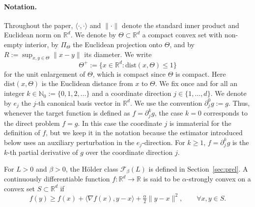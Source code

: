 \documentclass{article}
\renewcommand{\leq}{\leqslant}
\renewcommand{\geq}{\geqslant}
\renewcommand{\ge}{\geqslant}
\theoremstyle{definition}
\begin{document}

\paragraph{Notation.}
Throughout the paper, $\langle\cdot,\cdot\rangle$ and
$\|\cdot\|$ denote the standard inner product and Euclidean norm
on $\mathbb{R}^d$. We denote by $\Theta\subset\mathbb{R}^d$ a
compact convex set with non-empty interior, by $\Pi_\Theta$ the
Euclidean projection onto $\Theta$, and by
$R:=\sup_{x,y\in\Theta}\|x-y\|$ its diameter. We write
\[
\Theta^+:=\{x\in\mathbb{R}^d:\mathrm{dist}(x,\Theta)\leq 1\}
\]
for the unit enlargement of $\Theta$, which is compact since $\Theta$
is compact. Here $\mathrm{dist}(x,\Theta)$ is the Euclidean distance from $x$ to $\Theta$. We fix once and for all an integer
\(k\in\mathbb N_0:=\{0,1,2,\ldots\}\) and a coordinate direction
\(j\in\{1,\ldots,d\}\). We denote by $e_j$ the $j$-th canonical basis vector in $\mathbb{R}^d$. We use the convention
\(
\partial_j^0 g := g .
\)
Thus, whenever the target function is defined as \(f=\partial_j^k g\),
the case \(k=0\) corresponds to the direct problem \(f=g\). In this
case the coordinate \(j\) is immaterial for the definition of \(f\),
but we keep it in the notation because the estimator introduced below
uses an auxiliary perturbation in the \(e_j\)-direction. For \(k\ge1\),
\(f=\partial_j^k g\) is the \(k\)-th  partial derivative
of \(g\) over the coordinate direction $j$.

For $L>0$ and $\beta>0$, the H\"older class
$\mathcal{F}_\beta(L)$ is defined in Section~\ref{sec:prel}. A
continuously differentiable function $f:\mathbb{R}^d\to\mathbb{R}$ is said to be
$\alpha$-strongly convex on a convex set $S\subset\mathbb{R}^d$
if
\[
f(y)\geq f(x)+\langle\nabla f(x),y-x\rangle
+\tfrac{\alpha}{2}\|y-x\|^2,\qquad\forall x,y\in S.
\]
\end{document}
